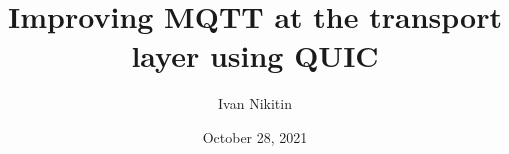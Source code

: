 \documentclass{l4proj}
\begin{document}
\makeatletter
\patchcmd{\NAT@test}{\else \NAT@nm}{\else \NAT@nmfmt{\NAT@nm}}{}{}

\DeclareRobustCommand\citepos
{\begingroup
    \let\NAT@nmfmt\NAT@posfmt
    \NAT@swafalse\let\NAT@ctype\z@\NAT@partrue
    \@ifstar{\NAT@fulltrue\NAT@citetp}{\NAT@fullfalse\NAT@citetp}}

\let\NAT@orig@nmfmt\NAT@nmfmt
\def\NAT@posfmt#1{
    \StrRemoveBraces{#1}[\NAT@temp]
    \IfEndWith{\NAT@temp}{s}
    {\NAT@orig@nmfmt{#1'}}
    {\NAT@orig@nmfmt{#1's}}}

\makeatother

\title{Improving MQTT at the transport layer using QUIC}
\author{Ivan Nikitin}
\date{October 28, 2021}

\maketitle



\def\consentname {Ivan Nikitin} %
\def\consentdate {25 March 2022} %
\educationalconsent


\tableofcontents









\begin{appendices}
    
    
\end{appendices}


\end{document}
